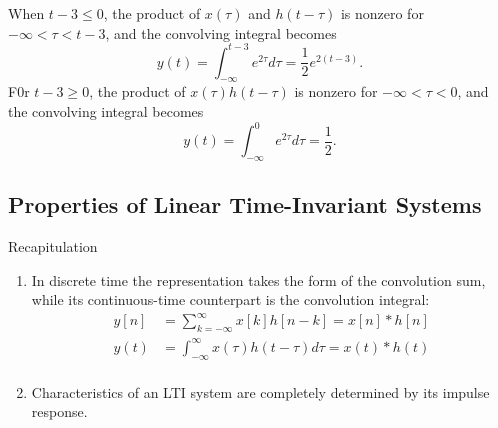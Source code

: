 \begin{frame}
    When $t-3 \leq 0$, the product of $x(\tau)$ and $h(t-\tau)$ is nonzero for $-\infty < \tau < t-3$, and the convolving integral becomes
    \begin{equation*}
        y(t) = \int_{-\infty}^{t-3}e^{2\tau}d\tau = \frac{1}{2}e^{2(t-3)}.
    \end{equation*}
    F0r $t-3 \geq 0$, the product of $x(\tau)h(t-\tau)$ is nonzero for $-\infty < \tau < 0$, and the convolving integral becomes
    \begin{equation*}
        y(t) = \int_{-\infty}^{0}e^{2\tau}d\tau = \frac{1}{2}.
    \end{equation*}
\end{frame}



\subsection{Properties of Linear Time-Invariant Systems}


\begin{frame}{Recapitulation}
    \begin{enumerate}
        \item In discrete time the representation takes the form of the convolution sum, while its continuous-time counterpart is the convolution integral:
            \begin{align*}
                y[n] &= \sum_{k=-\infty}^{\infty}x[k]h[n-k] = x[n]\ast h[n]\\
                y(t) &= \int_{-\infty}^{\infty}x(\tau)h(t-\tau)d\tau = x(t)\ast h(t)\\
            \end{align*}
        \item Characteristics of an LTI system are completely determined by its impulse response.
    \end{enumerate}

\end{frame}



